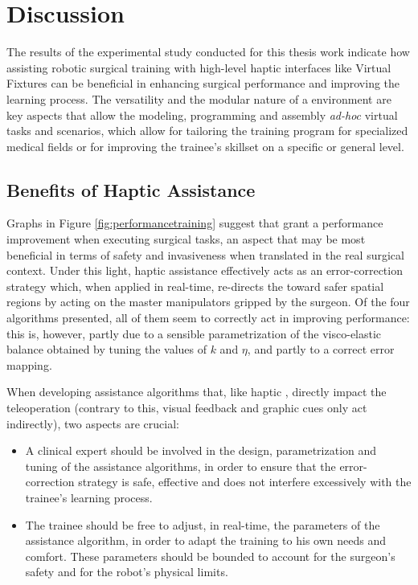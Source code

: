 \documentclass[../main.tex]{subfiles}
\begin{document}
\chapter{Discussion}
The results of the experimental study conducted for this thesis work indicate how assisting robotic surgical training with high-level haptic interfaces like Virtual Fixtures can be beneficial in enhancing surgical performance and improving the learning process. The versatility and the modular nature of a \vr environment are key aspects that allow the modeling, programming and assembly \textit{ad-hoc} virtual tasks and scenarios, which allow for tailoring the training program for specialized medical fields or for improving the trainee's skillset on a specific or general level.

\section{Benefits of Haptic Assistance}
Graphs in Figure \ref{fig:performancetraining} suggest that \vfs grant a performance improvement when executing surgical tasks, an aspect that may be most beneficial in terms of safety and invasiveness when translated in the real surgical context. Under this light, haptic assistance effectively acts as an error-correction strategy which, when applied in real-time, re-directs the \ee toward safer spatial regions by acting on the master manipulators gripped by the surgeon. Of the four algorithms presented, all of them seem to correctly act in improving performance: this is, however, partly due to a sensible parametrization of the visco-elastic balance obtained by tuning the values of $k$ and $\eta$, and partly to a correct error mapping. 

When developing assistance algorithms that, like haptic \vfs, directly impact the teleoperation (contrary to this, visual feedback and graphic cues only act indirectly), two aspects are crucial:

\begin{itemize}
    \item A clinical expert should be involved in the design, parametrization and tuning of the assistance algorithms, in order to ensure that the error-correction strategy is safe, effective and does not interfere excessively with the trainee's learning process. 
    \item The trainee should be free to adjust, in real-time, the parameters of the assistance algorithm, in order to adapt the training to his own needs and comfort. These parameters should be bounded to account for the surgeon's safety and for the robot's physical limits.
\end{itemize}
\end{document}
